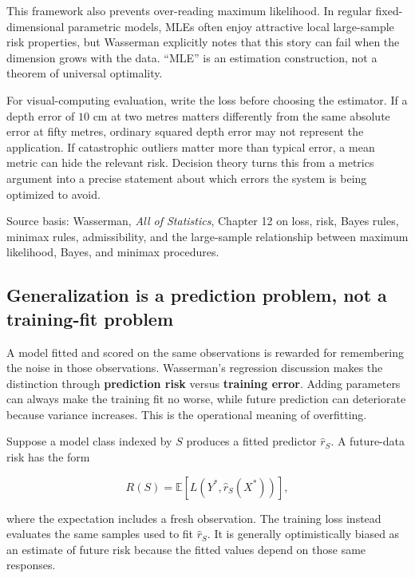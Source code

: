 This framework also prevents over-reading maximum likelihood. In regular fixed-dimensional parametric models, MLEs often enjoy attractive local large-sample risk properties, but Wasserman explicitly notes that this story can fail when the dimension grows with the data. ``MLE'' is an estimation construction, not a theorem of universal optimality.

For visual-computing evaluation, write the loss before choosing the estimator. If a depth error of \(10\) cm at two metres matters differently from the same absolute error at fifty metres, ordinary squared depth error may not represent the application. If catastrophic outliers matter more than typical error, a mean metric can hide the relevant risk. Decision theory turns this from a metrics argument into a precise statement about which errors the system is being optimized to avoid.

Source basis: Wasserman, \emph{All of Statistics}, Chapter 12 on loss, risk, Bayes rules, minimax rules, admissibility, and the large-sample relationship between maximum likelihood, Bayes, and minimax procedures.

\subsection{Generalization is a prediction problem, not a training-fit problem}\label{02-foundations-ii-ch030-generalization-is-a-prediction-problem-not-a-training-fit-problem}

\hypertarget{02-foundations-ii-ch030-generalization-is-a-prediction-problem-not-a-training-fit-problem}{}

A model fitted and scored on the same observations is rewarded for remembering the noise in those observations. Wasserman's regression discussion makes the distinction through \textbf{prediction risk} versus \textbf{training error}. Adding parameters can always make the training fit no worse, while future prediction can deteriorate because variance increases. This is the operational meaning of overfitting.

Suppose a model class indexed by \(S\) produces a fitted predictor \(\hat r_S\). A future-data risk has the form

\[
R(S)
=
\mathbb E[
L(Y^*,\hat r_S(X^*))
],
\]

where the expectation includes a fresh observation. The training loss instead evaluates the same samples used to fit \(\hat r_S\). It is generally optimistically biased as an estimate of future risk because the fitted values depend on those same responses.

